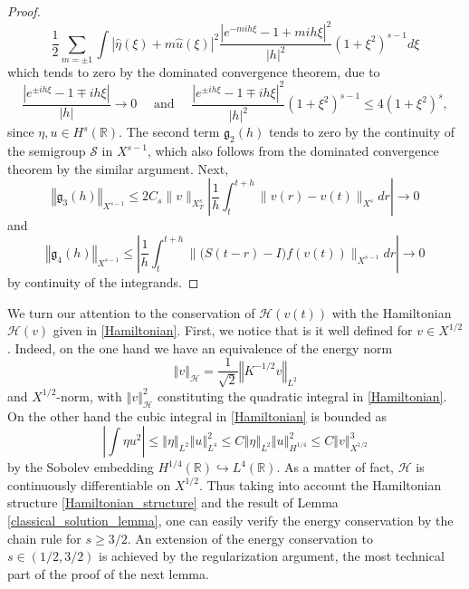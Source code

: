 \documentclass[reqno,12pt,a4paper]{article}
\theoremstyle{plain}
\newcommand{\R}{\mathbb{R}}
\newcommand{\Abs}[1]{\left\vert #1 \right\vert}
\newcommand{\norm}[1]{\left\Vert #1 \right\Vert}
\begin{document}
\begin{proof}
\[    \frac 12 \sum_{m = \pm 1}
    \int
    \Abs{ \widehat{\eta}(\xi) + m \widehat{u}(\xi) }^2
    \frac{ \Abs{ e^{ - m i h\xi} - 1 + m i h\xi }^2 }{ |h|^2 }
    \left( 1 + \xi^2 \right)^{s - 1}
    d \xi
\]
which tends to zero by the dominated convergence theorem,
due to
\[
    \frac{ \Abs{ e^{ \pm i h\xi} - 1 \mp i h\xi } }{ |h| }
    \to 0
    \quad
    \text{ and }
    \quad
    \frac{ \Abs{ e^{ \pm i h\xi} - 1 \mp i h\xi }^2 }{ |h|^2 }
    \left( 1 + \xi^2 \right)^{s - 1}
    \leqslant
    4
    \left( 1 + \xi^2 \right)^s
    ,
\]
since
\(
    \eta, u \in H^s(\R)
    .
\)
%
The second term $\mathfrak g_2(h)$ tends to zero
by the continuity of the semigroup $\mathcal S$ in $X^{s - 1}$,
which also follows from the dominated convergence theorem by the similar argument.
Next,
\[
    \norm{ \mathfrak g_3(h) }_{X^{s- 1}}
    \leqslant
	2 C_s \lVert v \rVert _{X^s_T}
    \Abs{
        \frac 1h
        \int_t^{t + h} \lVert v(r) - v(t) \rVert _{X^s} dr
    }
    \to 0
\]
and
\[
    \norm{ \mathfrak g_4(h) }_{X^{s- 1}}
    \leqslant
    \Abs{
        \frac 1h
        \int_t^{t + h} \lVert \mathcal ( S(t - r) - I ) f(v(t)) \rVert _{X^{s - 1}} dr
    }
    \to 0
\]
by continuity of the integrands.
%
\end{proof}

We turn our attention to the conservation of $\mathcal H(v(t))$
with the Hamiltonian $\mathcal H(v)$ given in \eqref{Hamiltonian}.
First, we notice that is it well defined for $v \in X^{1/2}$.
Indeed, on the one hand we have an equivalence of the energy norm
\begin{equation}
\label{energy_norm}
    \norm{v}_{\mathcal H}
    =
    \frac 1{\sqrt 2}
    \norm{K^{-1/2} v}_{L^2}
\end{equation}
and $X^{1/2}$-norm,
with
\(
    \norm{v}_{\mathcal H}^2
\)
constituting the quadratic integral in \eqref{Hamiltonian}.
On the other hand the cubic integral
in \eqref{Hamiltonian} is bounded as
\[
    \Abs{
        \int \eta u^2
    }
    \leqslant
    \norm{\eta}_{L^2}
    \norm{u}_{L^4}^2
    \leqslant
    C
    \norm{\eta}_{L^2}
    \norm{u}_{H^{1/4}}^2
    \leqslant
    C
    \norm{v}_{X^{1/2}}^3
\]
by the Sobolev embedding $H^{1/4}(\R) \hookrightarrow L^4(\R)$.
As a matter of fact,
$\mathcal H$ is continuously differentiable on $X^{1/2}$.
Thus taking into account the Hamiltonian structure \eqref{Hamiltonian_structure}
and the result of Lemma \ref{classical_solution_lemma},
one can easily verify the energy conservation by the chain rule for $s \geqslant 3/2$.
An extension of the energy conservation to $s \in (1/2, 3/2)$ is achieved
by the regularization argument,
the most technical part of the proof of the next lemma.
\end{document}
